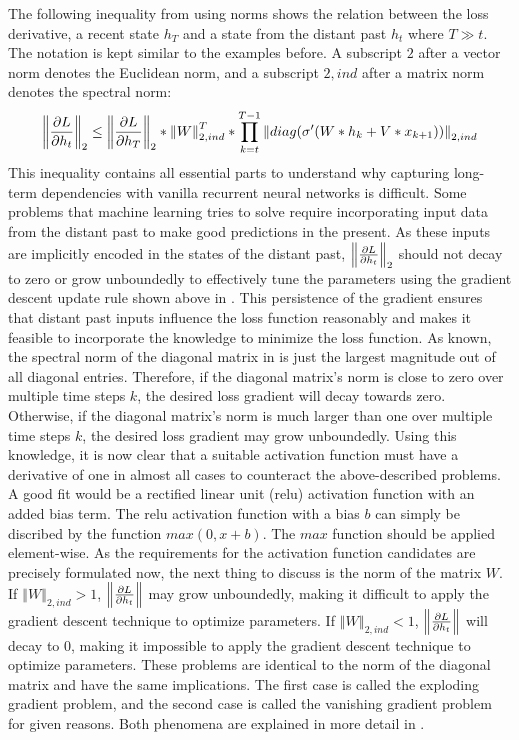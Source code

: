 \documentclass[draft,final]{vutinfth} %
\begin{document}
    The following inequality from \cite[p. 2]{UnitaryRNNs} using norms shows the relation between the loss derivative, a recent state $h_T$ and a state from the distant past $h_t$ where $T \gg t$.
    The notation is kept similar to the examples before. A subscript $2$ after a vector norm denotes the Euclidean norm, and a subscript $2,ind$ after a matrix norm denotes the spectral norm:
    \begin{align}
        \label{gradient_formula}
        \left\Vert \pdv{L}{h_t} \right\Vert_2 \leq \left\Vert \pdv{L}{h_T} \right\Vert_2 * \left\Vert W \right\Vert_{2,ind}^T * \prod^{T-1}_{k=t} \left\Vert diag(\sigma'(W*h_k + V*x_{k+1})) \right\Vert_{2,ind}
    \end{align}
    This inequality contains all essential parts to understand why capturing long-term dependencies with vanilla recurrent neural networks is difficult.
    Some problems that machine learning tries to solve require incorporating input data from the distant past to make good predictions in the present.
    As these inputs are implicitly encoded in the states of the distant past, $\left\Vert \pdv{L}{h_t} \right\Vert_2$ should not decay to zero or grow unboundedly to effectively tune the parameters using the gradient descent update rule shown above in .
    This persistence of the gradient ensures that distant past inputs influence the loss function reasonably and makes it feasible to incorporate the knowledge to minimize the loss function.
    As known, the spectral norm of the diagonal matrix in  is just the largest magnitude out of all diagonal entries.
    Therefore, if the diagonal matrix's norm is close to zero over multiple time steps $k$, the desired loss gradient will decay towards zero.
    Otherwise, if the diagonal matrix's norm is much larger than one over multiple time steps $k$, the desired loss gradient may grow unboundedly.
    Using this knowledge, it is now clear that a suitable activation function must have a derivative of one in almost all cases to counteract the above-described problems.
    A good fit would be a rectified linear unit (relu) activation function with an added bias term.
    The relu activation function with a bias $b$ can simply be discribed by the function $max(0,x+b)$. The $max$ function should be applied element-wise.
    As the requirements for the activation function candidates are precisely formulated now, the next thing to discuss is the norm of the matrix $W$.
    If $\left\Vert W \right\Vert_{2,ind} > 1$, $\left\Vert \pdv{L}{h_t} \right\Vert$ may grow unboundedly, making it difficult to apply the gradient descent technique to optimize parameters.
    If $\left\Vert W \right\Vert_{2,ind} < 1$, $\left\Vert \pdv{L}{h_t} \right\Vert$ will decay to $0$, making it impossible to apply the gradient descent technique to optimize parameters.
    These problems are identical to the norm of the diagonal matrix and have the same implications.
    The first case is called the exploding gradient problem, and the second case is called the vanishing gradient problem for given reasons.
    Both phenomena are explained in more detail in \cite{LongTermDependenciesGradientDescent}.
\end{document}

